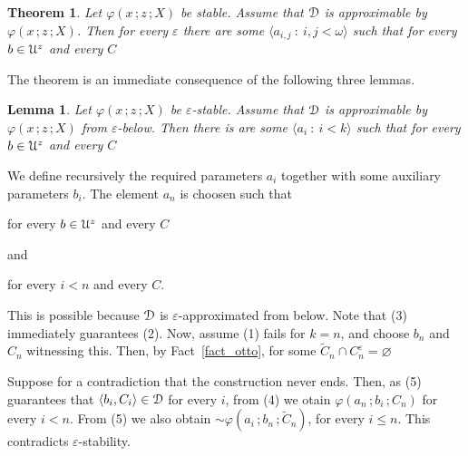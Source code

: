 \documentclass{amsproc}
\makeatletter
\newcounter{thm}
\theoremstyle{mio}
\newtheorem{theorem}[thm]{Theorem}\tcolorboxenvironment{theorem}{mythm}
\newtheorem{lemma}[thm]{Lemma}\tcolorboxenvironment{lemma}{mythm}
\providecommand{\proofNameStyle}{\bfseries}
\renewenvironment{proof}[1][\proofname]{\par
  \pushQED{\qed}%
  \normalfont%
  \trivlist
  \item[\hskip\labelsep
        \proofNameStyle
    #1\@addpunct{.}]\ignorespaces
}{%
  \popQED\endtrivlist\@endpefalse
}
\makeatother
\begin{document}
\begin{theorem}\label{thm_epsilon_stability_definability}
  Let $\varphi(x\,;z\,;X)$ be stable.
  Assume that ${\EuScript D}$ is approximable by $\varphi(x\,;z\,;X)$.
  Then for every $\varepsilon$ there are some $\langle a_{i,j}\ :\ i,j<\omega\rangle$ such that for every $b\in{\EuScript U}^z$ and every $C$\medskip

  \medskip

\end{theorem}

\begin{proof}
  The theorem is an immediate consequence of the following three lemmas.
\end{proof}

\begin{lemma}
  Let $\varphi(x\,;z\,;X)$ be $\varepsilon$-stable.
  Assume that ${\EuScript D}$ is approximable by $\varphi(x\,;z\,;X)$ from $\varepsilon$-below.
  Then there is are some $\langle a_i\ :\ i<k\rangle$ such that for every $b\in{\EuScript U}^z$ and every $C$\medskip

  \medskip 

\end{lemma}

\begin{proof}
  We define recursively the required parameters $a_i$ together with some auxiliary parameters $b_i$.
  The element $a_n$ is choosen such that

\hfill for every $b\in{\EuScript U}^z$ and every $C$

and

\hfill for every $i<n$ and every $C$.\smallskip

This is possible because ${\EuScript D}$ is $\varepsilon$-approximated from below.
Note that (3) immediately guarantees (2).
Now, assume (1) fails for $k=n$, and choose $b_n$ and $C_n$ witnessing this.
Then, by Fact~\ref{fact_otto}, for some $\tilde C_n\cap C_n^\varepsilon=\varnothing$


Suppose for a contradiction that the construction never ends.
Then, as (5) guarantees that $\langle b_i,C_i\rangle\in{\EuScript D}$ for every $i$, from (4) we otain $\varphi(a_n\,;b_i\,;C_n)$ for every $i<n$.
From (5) we also obtain ${\sim}\varphi(a_i\,;b_n\,;\tilde C_n)$, for every $i\le n$.
This contradicts $\varepsilon$-stability.
\end{proof}
\end{document}
